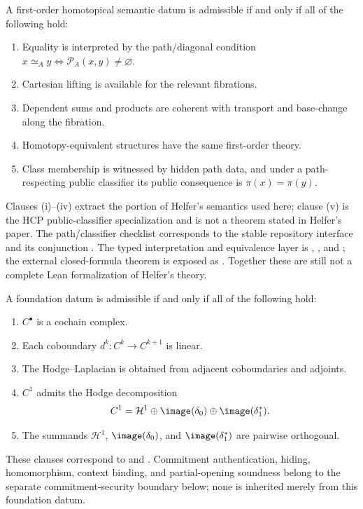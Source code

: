 \begin{definition}\label{def:helfer-semantic-boundary}
  A first-order homotopical semantic datum is admissible if and only if all
  of the following hold:
  \begin{enumerate}[label=(\roman*)]
    \item Equality is interpreted by the path/diagonal condition
      \(x\simeq_A y\Longleftrightarrow\mathcal P_A(x,y)\neq\varnothing\).
    \item Cartesian lifting is available for the relevant fibrations.
    \item Dependent sums and products are coherent with transport and
      base-change along the fibration.
    \item Homotopy-equivalent structures have the same first-order theory.
    \item Class membership is witnessed by hidden path data, and under a
      path-respecting public classifier its public consequence is
      \(\pi(x)=\pi(y)\).
  \end{enumerate}
  Clauses (i)--(iv) extract the portion of Helfer's semantics used here;
  clause (v) is the HCP public-classifier specialization and is not a theorem
  stated in Helfer's paper. The path/classifier checklist corresponds to the
  stable repository interface  and its conjunction
  . The typed interpretation and equivalence
  layer is ,
  , and
  ; the external closed-formula theorem
  is exposed as . Together these
  are still not a complete Lean formalization of Helfer's theory.
\end{definition}

\begin{definition}\label{def:foundation-assumption-boundary}
  A foundation datum is admissible if and only if all of the following hold:
  \begin{enumerate}[label=(\roman*)]
    \item \(C^\bullet\) is a cochain complex.
    \item Each coboundary \(d^k:C^k\to C^{k+1}\) is linear.
    \item The Hodge--Laplacian is obtained from adjacent coboundaries and
      adjoints.
    \item \(C^1\) admits the Hodge decomposition
      \[
        C^1=\mathcal H^1\oplus\image(\delta_0)\oplus\image(\delta_1^\ast).
      \]
    \item The summands
      \(\mathcal H^1\), \(\image(\delta_0)\), and
      \(\image(\delta_1^\ast)\) are pairwise orthogonal.
  \end{enumerate}
  These clauses correspond to  and
  .
  Commitment authentication, hiding, homomorphism, context binding, and
  partial-opening soundness belong to the separate commitment-security
  boundary below; none is inherited merely from this foundation datum.
\end{definition}

